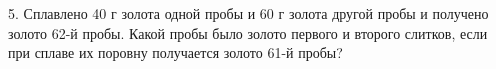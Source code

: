 5. Сплавлено 40 г золота одной пробы и 60 г золота другой пробы и получено золото 62-й пробы. Какой пробы было золото первого и второго слитков, если при сплаве их поровну получается золото 61-й пробы?\\
